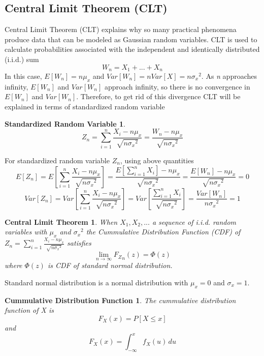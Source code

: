 \documentclass[12pt,fleqn]{report}
\begin{document}
\subsection{Central Limit Theorem (CLT)}
Central Limit Theorem (CLT) explains why so many practical phenomena produce data that can be modeled as Gaussian random variables. CLT is used to calculate probabilities associated with the independent and identically distributed (i.i.d.) sum $$ W_n = X_1 + ... + X_n $$
In this case, $ E[W_n] = n\mu_x $ and $ Var[W_n] = nVar[X] = n {\sigma_x}^2$. As \textit{n} approaches infinity, $ E[W_n]$ and $ Var[W_n] $ approach infinity, so there is no convergence in $E[W_n] $ and $ Var[W_n] $. Therefore, to get rid of this divergence CLT will be explained in terms of standardized random variable 
\newtheorem*{standartrv}{Standardized Random Variable}
\begin{standartrv}
$$ Z_n = \sum\limits_{i=1}^n \frac{X_i - n\mu_x}{\sqrt{n{\sigma_x}^2}} 
 =\frac{W_n - n\mu_x}{\sqrt{n{\sigma_x}^2}}
$$
\end{standartrv}
For standardized random variable $ Z_n $, using above quantities
\begin{equation}
  E[Z_n] =E\left[ \sum\limits_{i=1}^n \frac{X_i - n\mu_x}{\sqrt{n{\sigma_x}^2}}\right] = 
  \frac{E\left[\sum\limits_{i=1}^n X_i\right] - n\mu_x}{\sqrt{n{\sigma_x}^2}} = \frac{E[W_n] -n\mu_x}{\sqrt{n{\sigma_x}^2}} = 0
\end{equation}
\begin{equation}
 Var[Z_n] = Var\left[\sum\limits_{i=1}^n \frac{X_i - n\mu_x}{\sqrt{n{\sigma_x}^2}}\right]=
 Var\left[ \frac{\sum\limits_{i=1}^n X_i}{\sqrt{n{\sigma_x}^2}}\right] =\frac{Var[W_n]}{n{\sigma_x}^2} = 1
\end{equation}

\newtheorem*{CLT}{Central Limit Theorem}
\begin{CLT}
  When $X_1,X_2,...$ a sequence of i.i.d. random variables with $\mu_x$ and ${\sigma_x}^2$ the Cummulative Distribution Function (CDF) of $ Z_n = \sum\limits_{i=1}^n \frac{X_i - n\mu_x}{\sqrt{n{\sigma_x}^2}} $ satisfies 
$$  \lim_{n \rightarrow \infty} {F_Z}_n(z)=\Phi(z)$$ where $\Phi(z)$ is CDF of standard normal distribution.
\end{CLT}
Standard normal distribution is a normal distribution with $\mu_x=0$ and $\sigma_x=1$.

\newtheorem*{CDF}{Cummulative Distribution Function}
\begin{CDF}
  The cummulative distribution function of X is $$ F_X(x) = P[X \leq x] $$ and $$ F_X(x) = \int_{-\infty}^x f_X(u) \,du $$ 
\end{CDF}
  
\end{document}
